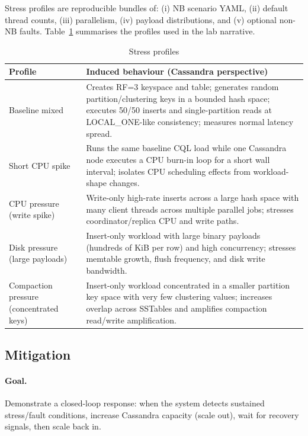 \documentclass[sigconf]{acmart}
\begin{document}
Stress profiles are reproducible bundles of: (i) NB scenario YAML, (ii) default thread counts, (iii) parallelism, (iv) payload distributions, and (v) optional non-NB faults. Table~\ref{tab:profiles} summarises the profiles used in the lab narrative.

\FloatBarrier
{}
\begin{table}[H]
\centering
\renewcommand{\arraystretch}{1.15}
\caption{Stress profiles}
\label{tab:profiles}
\begin{tabularx}{\linewidth}{@{}>{\raggedright\arraybackslash}p{3.5cm}>{\raggedright\arraybackslash}X@{}}
\toprule
\textbf{Profile} & \textbf{Induced behaviour (Cassandra perspective)} \\
\midrule
Baseline mixed &
Creates RF=3 keyspace and table; generates random partition/clustering keys in a bounded hash space; executes 50/50 inserts and single-partition reads at LOCAL\_ONE-like consistency; measures normal latency spread. \\
Short CPU spike &
Runs the same baseline CQL load while one Cassandra node executes a CPU burn-in loop for a short wall interval; isolates CPU scheduling effects from workload-shape changes. \\
CPU pressure (write spike) &
Write-only high-rate inserts across a large hash space with many client threads across multiple parallel jobs; stresses coordinator/replica CPU and write paths. \\
Disk pressure (large payloads) &
Insert-only workload with large binary payloads (hundreds of KiB per row) and high concurrency; stresses memtable growth, flush frequency, and disk write bandwidth. \\
Compaction pressure (concentrated keys) &
Insert-only workload concentrated in a smaller partition key space with very few clustering values; increases overlap across SSTables and amplifies compaction read/write amplification. \\
\bottomrule
\end{tabularx}
\renewcommand{\arraystretch}{1}
\end{table}
\FloatBarrier

\subsection{Mitigation}
\label{subsec:mitigation}

\paragraph{Goal.}
Demonstrate a closed-loop response: when the system detects sustained stress/fault conditions, increase Cassandra capacity (scale out), wait for recovery signals, then scale back in.
\end{document}
